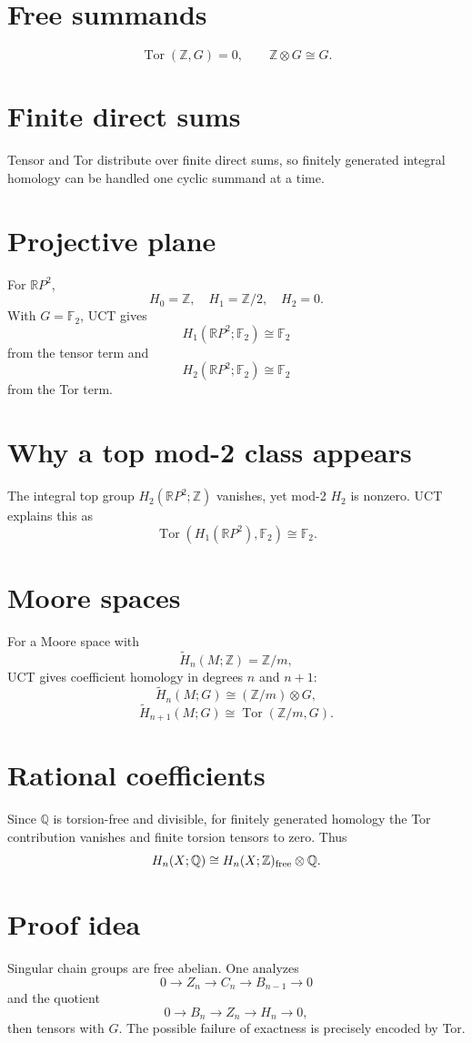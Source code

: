\section{Free summands}
\[
\operatorname{Tor}(\mathbb Z,G)=0,
\qquad
\mathbb Z\otimes G\cong G.
\]

\section{Finite direct sums}
Tensor and Tor distribute over finite direct sums, so finitely generated
integral homology can be handled one cyclic summand at a time.

\section{Projective plane}
For \(\mathbb RP^2\),
\[
H_0=\mathbb Z,\quad H_1=\mathbb Z/2,\quad H_2=0.
\]
With \(G=\mathbb F_2\), UCT gives
\[
H_1(\mathbb RP^2;\mathbb F_2)\cong\mathbb F_2
\]
from the tensor term and
\[
H_2(\mathbb RP^2;\mathbb F_2)\cong\mathbb F_2
\]
from the Tor term.

\section{Why a top mod-2 class appears}
The integral top group \(H_2(\mathbb RP^2;\mathbb Z)\) vanishes, yet mod-2
\(H_2\) is nonzero.  UCT explains this as
\[
\operatorname{Tor}(H_1(\mathbb RP^2),\mathbb F_2)
\cong\mathbb F_2.
\]

\section{Moore spaces}
For a Moore space with
\[
\widetilde H_n(M;\mathbb Z)=\mathbb Z/m,
\]
UCT gives coefficient homology in degrees \(n\) and \(n+1\):
\[
\widetilde H_n(M;G)\cong (\mathbb Z/m)\otimes G,
\]
\[
\widetilde H_{n+1}(M;G)
\cong
\operatorname{Tor}(\mathbb Z/m,G).
\]

\section{Rational coefficients}
Since \(\mathbb Q\) is torsion-free and divisible, for finitely generated
homology the Tor contribution vanishes and finite torsion tensors to zero.
Thus
\[
H_n(X;\mathbb Q)
\cong
H_n(X;\mathbb Z)_{\rm free}\otimes\mathbb Q.
\]

\section{Proof idea}
Singular chain groups are free abelian.  One analyzes
\[
0\to Z_n\to C_n\to B_{n-1}\to0
\]
and the quotient
\[
0\to B_n\to Z_n\to H_n\to0,
\]
then tensors with \(G\).  The possible failure of exactness is precisely
encoded by Tor.

